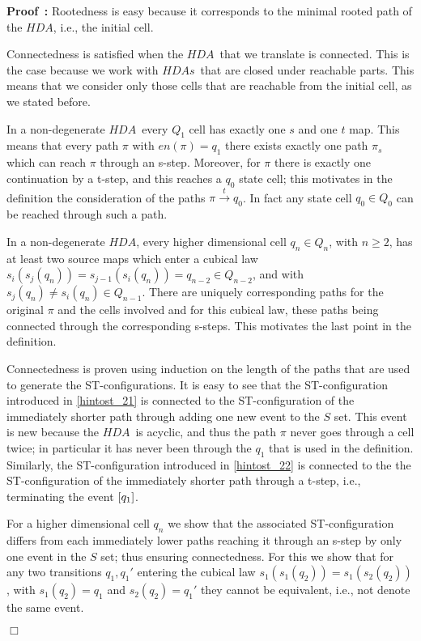 \documentclass[submission,copyright,creativecommons]{eptcs}
\newenvironment{proof}[1][\!\!\,]{\vspace{1ex}\noindent\textbf{Proof #1: }}{\hfill$\Box$\vspace{2ex}}
\newcounter{case}
\newcommand\HDA{\ensuremath{\mathit{HDA}}}
\newcommand\HDAs{\ensuremath{\mathit{HDAs}}}
\newcommand\finishPath[1]{\ensuremath{\mathit{en}(#1)}}
\newcommand{\equivClass}[2][]{\ensuremath{[#2]\ifthenelse{\equal{#1}{}}{}{_{#1}}}}
\newcommand{\transition}[1]{\ensuremath{\xrightarrow{#1}}}
\begin{document}
\begin{proof}
Rootedness is easy because it corresponds to the minimal rooted path of the \HDA, i.e., the initial cell.

Connectedness is satisfied when the \HDA\ that we translate is connected. This is the case because we work with \HDAs\ that are closed under reachable parts. This means that we consider only those cells that are reachable from the initial cell, as we stated before.

In a non-degenerate \HDA\ every $Q_{1}$ cell has exactly one $s$ and one $t$ map. This means that every path $\pi$ with $\finishPath{\pi}=q_{1}$ there exists exactly one path $\pi_{s}$ which can reach $\pi$ through an s-step. Moreover, for $\pi$ there is exactly one continuation by a t-step, and this reaches a $q_{0}$ state cell; this motivates in the definition the consideration of the paths $\pi\transition{t}q_{0}$. In fact any state cell $q_{0}\in Q_{0}$ can be reached through such a path.

In a non-degenerate \HDA, every higher dimensional cell $q_{n}\in Q_{n}$, with $n\geq 2$, has at least two source maps which enter a cubical law $s_{i}(s_{j}(q_{n}))=s_{j-1}(s_{i}(q_{n}))=q_{n-2}\in Q_{n-2}$, and with $s_{j}(q_{n})\neq s_{i}(q_{n}) \in Q_{n-1}$. There are uniquely corresponding paths for the original $\pi$ and the cells involved and for this cubical law, these paths being connected through the corresponding s-steps. This motivates the last point in the definition.

Connectedness is proven using induction on the length of the paths that are used to generate the ST-configurations.
It is easy to see that the ST-configuration introduced in \ref{hintost_21} is connected to the ST-configuration of the immediately shorter path through adding one new event to the $S$ set. This event is new because the \HDA\ is acyclic, and thus the path $\pi$ never goes through a cell twice; in particular it has never been through the $q_{1}$ that is used in the definition.
Similarly, the ST-configuration introduced in \ref{hintost_22} is connected to the the ST-configuration of the immediately shorter path through a t-step, i.e., terminating the event $\equivClass{q_{1}}$.

For a higher dimensional cell $q_{n}$ we show that the associated ST-configuration differs from each immediately lower paths reaching it through an s-step by only one event in the $S$ set; thus ensuring connectedness.
For this we show that for any two transitions $q_{1},q_{1}'$ entering the cubical law $s_{1}(s_{1}(q_{2}))=s_{1}(s_{2}(q_{2}))$, with $s_{1}(q_{2})=q_{1}$ and $s_{2}(q_{2})=q_{1}'$ they cannot be equivalent, i.e., not denote the same event.




\end{proof}
\end{document}
